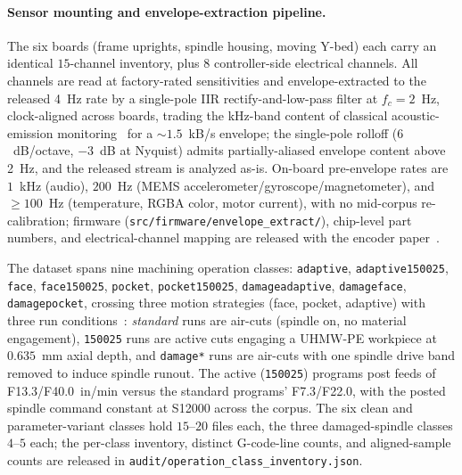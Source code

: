 \documentclass[sensors,article,submit,moreauthors,pdftex]{Definitions/mdpi}
\begin{document}
\paragraph{Sensor mounting and envelope-extraction pipeline.} The six boards (frame uprights, spindle housing, moving Y-bed) each carry an identical $15$-channel inventory, plus 8 controller-side electrical channels. All channels are read at factory-rated sensitivities and envelope-extracted to the released 4~Hz rate by a single-pole IIR rectify-and-low-pass filter at $f_c\!=\!2$~Hz, clock-aligned across boards, trading the kHz-band content of classical acoustic-emission monitoring~\cite{teti2010advanced} for a $\sim 1.5$~kB/s envelope; the single-pole rolloff ($6$~dB/octave, $-3$~dB at Nyquist) admits partially-aliased envelope content above 2~Hz, and the released stream is analyzed as-is. On-board pre-envelope rates are $1$~kHz (audio), $200$~Hz (MEMS accelerometer/gyroscope/magnetometer), and $\geq\!100$~Hz (temperature, RGBA color, motor current), with no mid-corpus re-calibration; firmware (\texttt{src/firmware/envelope\_extract/}), chip-level part numbers, and electrical-channel mapping are released with the encoder paper~\cite{encoder_paper}.

The dataset spans nine machining operation classes: \texttt{adaptive}, \texttt{adaptive150025}, \texttt{face}, \texttt{face150025}, \texttt{pocket}, \texttt{pocket150025}, \texttt{damageadaptive}, \texttt{damageface}, \texttt{damagepocket}, crossing three motion strategies (face, pocket, adaptive) with three run conditions~\cite{encoder_paper}: \emph{standard} runs are air-cuts (spindle on, no material engagement), \texttt{150025} runs are active cuts engaging a UHMW-PE workpiece at $0.635$~mm axial depth, and \texttt{damage*} runs are air-cuts with one spindle drive band removed to induce spindle runout. The active (\texttt{150025}) programs post feeds of F13.3/F40.0~in/min versus the standard programs' F7.3/F22.0, with the posted spindle command constant at S12000 across the corpus. The six clean and parameter-variant classes hold $15$--$20$ files each, the three damaged-spindle classes $4$--$5$ each; the per-class inventory, distinct G-code-line counts, and aligned-sample counts are released in \texttt{audit/operation\_class\_inventory.json}.
\end{document}
